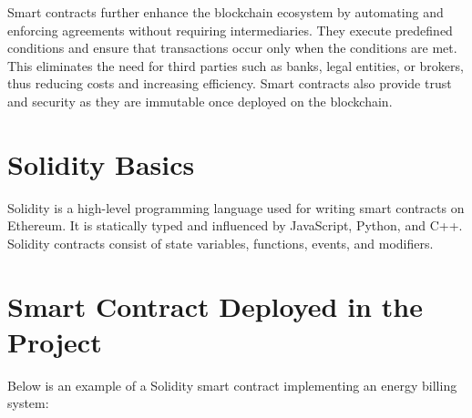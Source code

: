 \documentclass[a4paper,12pt]{report}
\begin{document}
 Smart contracts further enhance the blockchain ecosystem by automating and enforcing agreements without requiring intermediaries. They execute predefined conditions and ensure that transactions occur only when the conditions are met. This eliminates the need for third parties such as banks, legal entities, or brokers, thus reducing costs and increasing efficiency. Smart contracts also provide trust and security as they are immutable once deployed on the blockchain.
 
 \section{Solidity Basics}
 Solidity is a high-level programming language used for writing smart contracts on Ethereum. It is statically typed and influenced by JavaScript, Python, and C++. Solidity contracts consist of state variables, functions, events, and modifiers. 
 
 \section{Smart Contract Deployed in the Project}
 Below is an example of a Solidity smart contract implementing an energy billing system:
 
\end{document}
